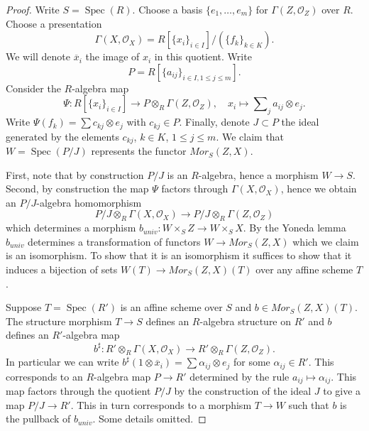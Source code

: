 \documentclass[10pt,a4paper]{amsart}
\theoremstyle{plain}
\theoremstyle{definition}
\theoremstyle{remark}
\numberwithin{equation}{subsection}
\def\Spec{\mathop{\mathrm{Spec}}}
\begin{document}
\begin{proof}
Write $S = \Spec(R)$. Choose a basis $\{e_1, \ldots, e_m\}$
for $\Gamma(Z, \mathcal{O}_Z)$ over $R$. Choose a presentation
$$
\Gamma(X, \mathcal{O}_X) = R[\{x_i\}_{i \in I}]/(\{f_k\}_{k \in K}).
$$
We will denote $\overline{x}_i$ the image of $x_i$ in this quotient.
Write
$$
P = R[\{a_{ij}\}_{i \in I, 1 \leq j \leq m}].
$$
Consider the $R$-algebra map
$$
\Psi :
R[\{x_i\}_{i \in I}]
\longrightarrow
P \otimes_R \Gamma(Z, \mathcal{O}_Z), \quad
x_i \longmapsto \sum\nolimits_j a_{ij} \otimes e_j.
$$
Write $\Psi(f_k) = \sum c_{kj} \otimes e_j$ with $c_{kj} \in P$.
Finally, denote $J \subset P$ the ideal generated by the elements
$c_{kj}$, $k \in K$, $1 \leq j \leq m$. We claim that
$W = \Spec(P/J)$ represents the functor $\mathit{Mor}_S(Z, X)$.

\medskip\noindent
First, note that by construction $P/J$ is an $R$-algebra, hence
a morphism $W \to S$. Second, by construction the map
$\Psi$ factors through $\Gamma(X, \mathcal{O}_X)$, hence we obtain
an $P/J$-algebra homomorphism
$$
P/J \otimes_R \Gamma(X, \mathcal{O}_X)
\longrightarrow
P/J \otimes_R \Gamma(Z, \mathcal{O}_Z)
$$
which determines a morphism
$b_{univ} : W \times_S Z \to W \times_S X$.
By the Yoneda lemma $b_{univ}$ determines a
transformation of functors $W \to \mathit{Mor}_S(Z, X)$ which we
claim is an isomorphism. To show that it is an isomorphism it suffices
to show that it induces a bijection of sets
$W(T) \to \mathit{Mor}_S(Z, X)(T)$ over any affine
scheme $T$.

\medskip\noindent
Suppose $T = \Spec(R')$ is an affine scheme over $S$
and $b \in \mathit{Mor}_S(Z, X)(T)$. The structure morphism $T \to S$
defines an $R$-algebra structure on $R'$ and $b$ defines an $R'$-algebra map
$$
b^\sharp :
R' \otimes_R \Gamma(X, \mathcal{O}_X)
\longrightarrow
R' \otimes_R \Gamma(Z, \mathcal{O}_Z).
$$
In particular we can write
$b^\sharp(1 \otimes \overline{x}_i) = \sum \alpha_{ij} \otimes e_j$
for some $\alpha_{ij} \in R'$. This corresponds to an $R$-algebra map
$P \to R'$ determined by the rule $a_{ij} \mapsto \alpha_{ij}$. This
map factors through the quotient $P/J$ by the construction of the ideal
$J$ to give a map $P/J \to R'$. This in turn corresponds to a morphism
$T \to W$ such that $b$ is the pullback of $b_{univ}$.
Some details omitted.
\end{proof}
\end{document}

